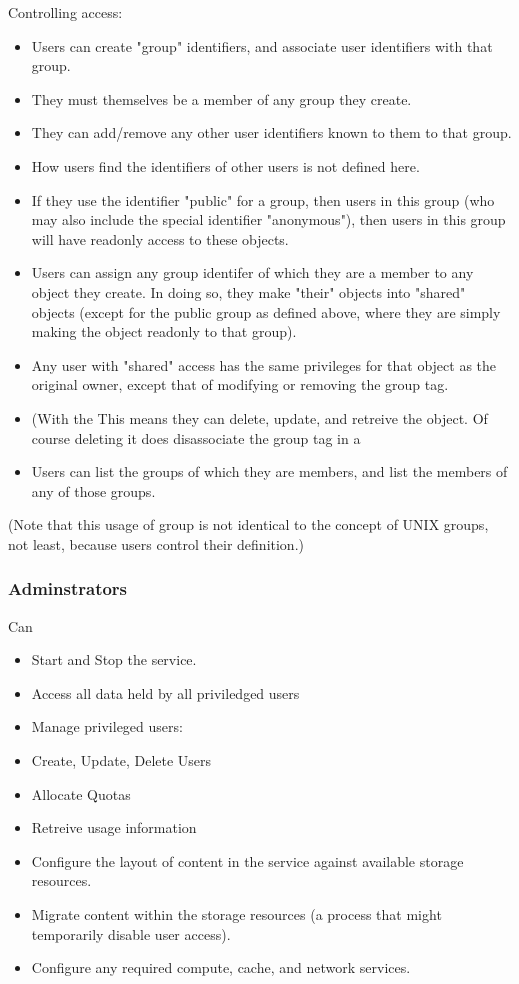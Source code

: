 \documentclass{../../template/esiwace-report}
\begin{document}
Controlling access:
\begin{itemize}
\item Users can create "group" identifiers, and associate user identifiers with that group.
\item They must themselves be a member of any group they create.
\item They can add/remove any other user identifiers known to them to that group.
\item How users find the identifiers of other users is not defined here.
\item If they use the identifier "public" for a group, then users in this group (who may also include the special identifier "anonymous"), then users in this group will have readonly access to these objects.
\item Users can assign any group identifer of which they are a member to any object they create. In doing so, they make "their" objects into "shared" objects (except for the public group as defined above, where they are simply making the object readonly to that group).
\item Any user with "shared" access has the same privileges for that object as the original owner, except that of modifying or removing the group tag.
\item (With the This means they can delete, update, and retreive the object. Of course deleting it does disassociate the group tag in a 
\item Users can list the groups of which they are members, and list the members of any of those groups.
\end{itemize}


(Note that this usage of group is not identical to the concept of UNIX groups, not least, because users control their definition.)

\subsubsection{Adminstrators}

Can

\begin{itemize}
\item Start and Stop the service.
\item  Access all data held by all priviledged users
\item  Manage privileged users:
\item  Create, Update, Delete Users
\item  Allocate Quotas
\item  Retreive usage information
\item  Configure the layout of content in the service against available storage resources.
\item  Migrate content within the storage resources (a process that might temporarily disable user access). 
\item  Configure any required compute, cache, and network services.
\end{itemize}
\end{document}
